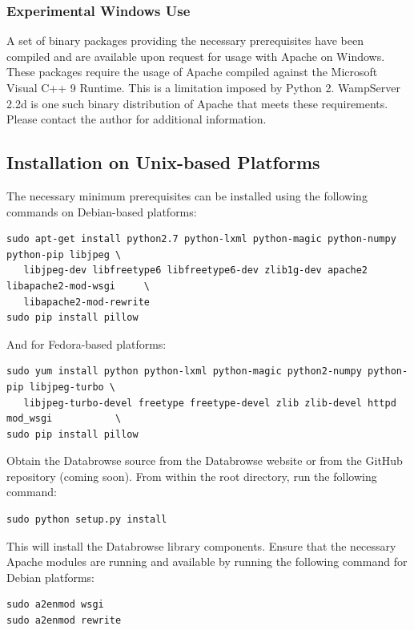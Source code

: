 \documentclass[10pt]{article}
\begin{document}
\subsubsection{Experimental Windows Use}

A set of binary packages providing the necessary prerequisites have been compiled and are available upon request for usage with Apache on Windows.  These packages require the usage of Apache compiled against the Microsoft Visual C++ 9 Runtime.  This is a limitation imposed by Python 2.  WampServer 2.2d is one such binary distribution of Apache that meets these requirements.  Please contact the author for additional information. 

\subsection{Installation on Unix-based Platforms}

The necessary minimum prerequisites can be installed using the following commands on Debian-based platforms:

\begin{verbatim}
sudo apt-get install python2.7 python-lxml python-magic python-numpy python-pip libjpeg \
   libjpeg-dev libfreetype6 libfreetype6-dev zlib1g-dev apache2 libapache2-mod-wsgi     \
   libapache2-mod-rewrite
sudo pip install pillow
\end{verbatim}

And for Fedora-based platforms:

\begin{verbatim}
sudo yum install python python-lxml python-magic python2-numpy python-pip libjpeg-turbo \
   libjpeg-turbo-devel freetype freetype-devel zlib zlib-devel httpd mod_wsgi           \
sudo pip install pillow
\end{verbatim}

Obtain the Databrowse source from the Databrowse website or from the GitHub repository (coming soon).  From within the root directory, run the following command:

\begin{verbatim}
sudo python setup.py install
\end{verbatim}

This will install the Databrowse library components.  Ensure that the necessary Apache modules are running and available by running the following command for Debian platforms:

\begin{verbatim}
sudo a2enmod wsgi
sudo a2enmod rewrite
\end{verbatim}
\end{document}

